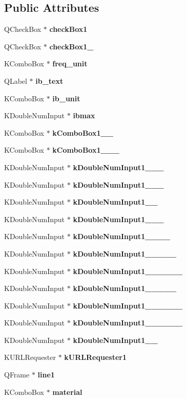 \subsection*{Public Attributes}
\begin{CompactItemize}
\item 
QCheck\-Box $\ast$ {\bf check\-Box1}
\item 
QCheck\-Box $\ast$ {\bf check\-Box1\_}
\item 
KCombo\-Box $\ast$ {\bf freq\_\-unit}
\item 
QLabel $\ast$ {\bf ib\_\-text}
\item 
KCombo\-Box $\ast$ {\bf ib\_\-unit}
\item 
KDouble\-Num\-Input $\ast$ {\bf ibmax}
\item 
KCombo\-Box $\ast$ {\bf k\-Combo\-Box1\_\_}
\item 
KCombo\-Box $\ast$ {\bf k\-Combo\-Box1\_\_\_}
\item 
KDouble\-Num\-Input $\ast$ {\bf k\-Double\-Num\-Input1\_\_\_}
\item 
KDouble\-Num\-Input $\ast$ {\bf k\-Double\-Num\-Input1\_\_\_}
\item 
KDouble\-Num\-Input $\ast$ {\bf k\-Double\-Num\-Input1\_\_}
\item 
KDouble\-Num\-Input $\ast$ {\bf k\-Double\-Num\-Input1\_\_\_}
\item 
KDouble\-Num\-Input $\ast$ {\bf k\-Double\-Num\-Input1\_\_\_\_}
\item 
KDouble\-Num\-Input $\ast$ {\bf k\-Double\-Num\-Input1\_\_\_\_\_}
\item 
KDouble\-Num\-Input $\ast$ {\bf k\-Double\-Num\-Input1\_\_\_\_\_\_}
\item 
KDouble\-Num\-Input $\ast$ {\bf k\-Double\-Num\-Input1\_\_\_\_\_}
\item 
KDouble\-Num\-Input $\ast$ {\bf k\-Double\-Num\-Input1\_\_\_\_\_\_}
\item 
KDouble\-Num\-Input $\ast$ {\bf k\-Double\-Num\-Input1\_\_\_\_\_\_}
\item 
KDouble\-Num\-Input $\ast$ {\bf k\-Double\-Num\-Input1\_\_}
\item 
KURLRequester $\ast$ {\bf k\-URLRequester1}
\item 
QFrame $\ast$ {\bf line1}
\item 
KCombo\-Box $\ast$ {\bf material}
\item 

\end{CompactItemize}
